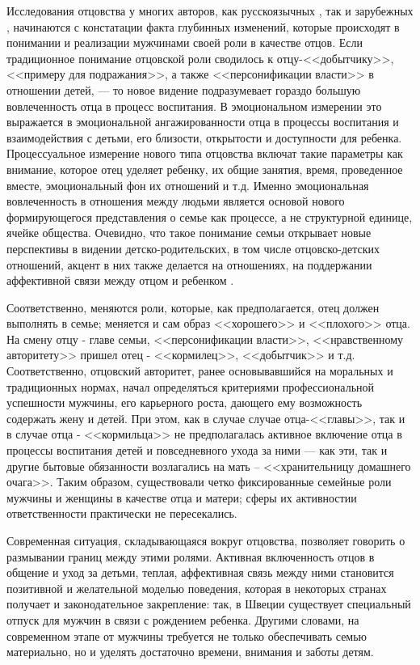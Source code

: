 \documentclass{../../common/thesisbyxetex}
\begin{document}
Исследования отцовства у многих авторов, как русскоязычных \cite{relot, psyot}, так и зарубежных
\cite{meta, morfat, legfat}, начинаются с констатации факта глубинных изменений, которые происходят
в понимании и реализации мужчинами своей роли в качестве отцов. Если традиционное понимание
отцовской роли сводилось к отцу-<<добытчику>>, <<примеру для подражания>>, а также
<<персонификации власти>> в отношении детей, --- то новое видение подразумевает гораздо большую
вовлеченность отца в процесс воспитания. В эмоциональном измерении это выражается в  эмоциональной
ангажированности отца в процессы воспитания и взаимодействия с детьми, его близости, открытости и
доступности для ребенка. Процессуальное измерение нового типа отцовства включат такие параметры как
внимание, которое отец уделяет ребенку, их общие занятия, время, проведенное вместе, эмоциональный
фон их отношений и т.д.
Именно эмоциональная вовлеченность в отношения между людьми является основой нового формирующегося
представления о семье как процессе, а не структурной единице, ячейке общества. Очевидно, что такое
понимание семьи открывает новые перспективы в видении детско-родительских, в том числе
отцовско-детских отношений, акцент в них также делается на отношениях, на поддержании
аффективной
связи между отцом и ребенком \cite[15]{fatpsy}.

Соответственно, меняются роли, которые, как предполагается, отец должен выполнять в семье; меняется
и сам образ <<хорошего>> и  <<плохого>> отца. На смену отцу - главе семьи, <<персонификации
власти>>,
<<нравственному авторитету>> пришел отец - <<кормилец>>, <<добытчик>> и т.д. Соответственно,
отцовский авторитет, ранее основывавшийся на моральных и традиционных нормах, начал определяться
критериями профессиональной успешности мужчины, его карьерного роста, дающего ему возможность
содержать жену и детей. При этом, как в случае случае отца-<<главы>>, так и в случае отца -
<<кормильца>> не предполагалась активное включение отца в процессы воспитания детей и повседневного
ухода за ними --- как эти, так и другие бытовые обязанности возлагались на мать -- <<хранительницу
домашнего очага>>. Таким образом, существовали четко фиксированные семейные роли мужчины и женщины
в качестве отца и матери; сферы их активностии ответственности практически не пересекались.

Современная ситуация, складывающаяся вокруг отцовства, позволяет говорить о размывании границ между
этими ролями. Активная включенность отцов в общение и уход за детьми, теплая, аффективная связь
между ними становится позитивной и желательной моделью поведения, которая в некоторых странах
получает и законодательное закрепление: так, в Швеции существует специальный отпуск для мужчин в
связи с рождением ребенка. Другими словами, на современном  этапе от мужчины требуется не только
обеспечивать семью
материально, но и уделять
достаточно времени, внимания и заботы детям.
\end{document}

